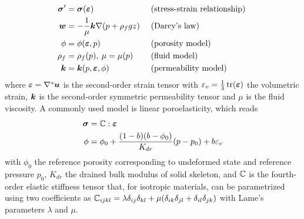 \begin{align}
    \bm{\sigma}^\prime &= \bm{\sigma}(\bm{\varepsilon})  & & \mbox{ (stress-strain relationship) } \label{eq:constitutive_stress} \\
    \bm{w} &= - \frac{1}{\mu}\bm{k}\nabla(p + \rho_f g z) & & \mbox{ (Darcy's law) } \label{eq:constitutive_darcy} \\
    \phi &= \phi(\bm{\varepsilon}, p) & & \mbox{ (porosity model) } \label{eq:constitutive_porosity} \\
    \rho_f &= \rho_f(p), \: \mu = \mu(p) & & \mbox{ (fluid model) } \label{eq:constitutive_fluid} \\
    \bm{k} &= \bm{k}(p,\bm{\varepsilon},\phi) & & \mbox{ (permeability model) } \label{eq:constitutive_permeability}
\end{align}
where $\bm{\varepsilon} = \nabla^s \bm{u}$ is the second-order strain tensor with $\varepsilon_v = \frac{1}{3}\operatorname{tr}(\bm{\varepsilon})$ the volumetric strain, $\bm{k}$ is the second-order symmetric permeability tensor and $\mu$ is the fluid viscosity.   A commonly used model is linear poroelasticity, which reads
\begin{align}
    \bm{\sigma} &= \mathbb{C} : \bm{\varepsilon} \\
    \phi &= \phi_0 + \frac{(1 - b)(b - \phi_0)}{K_{dr}}(p - p_0) + b\varepsilon_v \\
\end{align}
with $\phi_0$ the reference porosity corresponding to undeformed state and reference pressure $p_0$, $K_{dr}$ the drained bulk modulus of solid skeleton, and $\mathbb{C}$ is the fourth-order elastic stiffness tensor that, for isotropic materials, can be parametrized using two coefficients as $\mathbb{C}_{ijkl} = \lambda \delta_{ij} \delta_{kl} + \mu(\delta_{ik} \delta_{jl} + \delta_{il} \delta_{jk})$ with Lame's parameters $\lambda$ and $\mu$.


